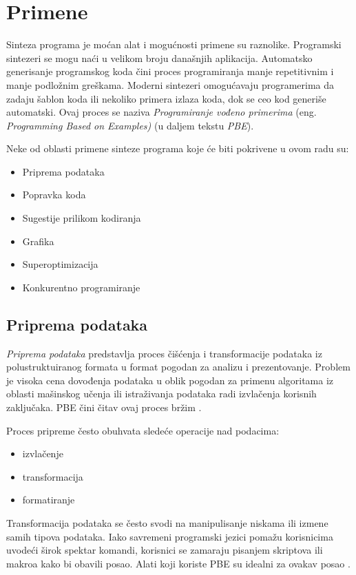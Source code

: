 \section{Primene}
\label{sec:Primene}

Sinteza programa je moćan alat i mogućnosti primene su raznolike. Programski sintezeri se mogu naći u velikom broju današnjih aplikacija. Automatsko generisanje programskog koda čini proces programiranja manje repetitivnim i manje podložnim greškama. Moderni sintezeri omo\-gu\-ća\-va\-ju programerima da zadaju šablon koda ili nekoliko primera izlaza koda, dok se ceo kod generiše automatski. Ovaj proces se naziva \emph{Programiranje vođeno primerima} (eng. \emph{Programming Based on Examples)} \cite{ProgrammingBasedOnExamples} (u daljem tekstu \emph{PBE}).

Neke od oblasti primene sinteze programa koje će biti pokrivene u ovom radu su:
\begin{itemize}
    \item Priprema podataka
    \item Popravka koda
    \item Sugestije prilikom kodiranja
    \item Grafika
    \item Superoptimizacija
    \item Konkurentno programiranje
\end{itemize}


\subsection{Priprema podataka}
\label{subsec:PripremaPodataka}

\emph{Priprema podataka} predstavlja proces čišćenja i transformacije podataka iz polustruktuiranog formata u format pogodan za analizu i prezentovanje. Problem je visoka cena dovođenja podataka u oblik pogodan za primenu algoritama iz oblasti mašinskog učenja ili istraživanja podataka radi izvlačenja korisnih zaključaka. PBE čini čitav ovaj proces bržim \cite{ProgrammingBasedOnExamples}.

Proces pripreme često obuhvata sledeće operacije nad podacima:
\begin{itemize}
    \item izvlačenje
    \item transformacija
    \item formatiranje
\end{itemize}

Transformacija podataka se često svodi na manipulisanje niskama ili izmene samih tipova podataka. Iako savremeni programski jezici pomažu korisnicima uvodeći širok spektar komandi, korisnici se zamaraju pisanjem skriptova ili makroa kako bi obavili posao. Alati koji koriste PBE su idealni za ovakav posao \cite{ProgrammingBasedOnExamples, SynthesizingNumberTransformationsFromIOExamples}.


